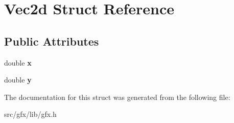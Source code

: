 \hypertarget{struct_vec2d}{}\section{Vec2d Struct Reference}
\label{struct_vec2d}
\subsection*{Public Attributes}
\begin{DoxyCompactItemize}
\item 
\mbox{\label{struct_vec2d_a2f2289c32bb0ae9c85facaf6b4643fa8}} 
double {\bfseries x}
\item 
\mbox{\label{struct_vec2d_aa314dea89fb8f30bc110f184d0a2813c}} 
double {\bfseries y}
\end{DoxyCompactItemize}


The documentation for this struct was generated from the following file\+:\begin{DoxyCompactItemize}
\item 
src/gfx/lib/gfx.\+h\end{DoxyCompactItemize}
